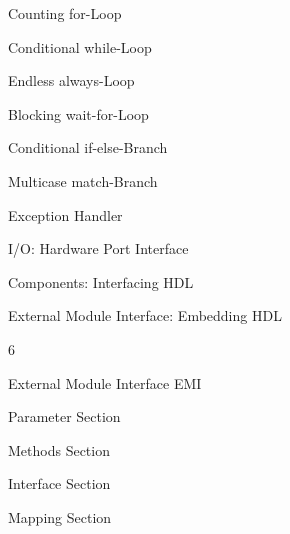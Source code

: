 \def\tocLXXXIII{Counting for-Loop}
{\bf{\parbox{0.95\textwidth}{\hskip20pt\tocLXXXIII\dotfill\pageref{toclabelLXXXIII}}}}\vskip5pt

\def\tocLXXXIV{Conditional while-Loop}
{\bf{\parbox{0.95\textwidth}{\hskip20pt\tocLXXXIV\dotfill\pageref{toclabelLXXXIV}}}}\vskip5pt

\def\tocLXXXV{Endless always-Loop}
{\bf{\parbox{0.95\textwidth}{\hskip20pt\tocLXXXV\dotfill\pageref{toclabelLXXXV}}}}\vskip5pt

\def\tocLXXXVI{Blocking wait-for-Loop}
{\bf{\parbox{0.95\textwidth}{\hskip20pt\tocLXXXVI\dotfill\pageref{toclabelLXXXVI}}}}\vskip5pt

\def\tocLXXXVII{Conditional if-else-Branch}
{\bf{\parbox{0.95\textwidth}{\hskip20pt\tocLXXXVII\dotfill\pageref{toclabelLXXXVII}}}}\vskip5pt

\def\tocLXXXVIII{Multicase match-Branch}
{\bf{\parbox{0.95\textwidth}{\hskip20pt\tocLXXXVIII\dotfill\pageref{toclabelLXXXVIII}}}}\vskip5pt

\def\tocLXXXIX{Exception Handler}
{\bf{\parbox{0.95\textwidth}{\hskip20pt\tocLXXXIX\dotfill\pageref{toclabelLXXXIX}}}}\vskip5pt

\def\tocXC{I/O: Hardware Port Interface}
{\bf{\parbox{0.95\textwidth}{\hskip10pt\tocXC\dotfill\pageref{toclabelXC}}}}\vskip5pt

\def\tocXCI{Components: Interfacing HDL}
{\bf{\parbox{0.95\textwidth}{\hskip20pt\tocXCI\dotfill\pageref{toclabelXCI}}}}\vskip5pt

\def\tocXCII{External Module Interface: Embedding HDL}
{\bf{\parbox{0.95\textwidth}{\hskip20pt\tocXCII\dotfill\pageref{toclabelXCII}}}}\vskip5pt

\def\tocXCIII{External Module Interface EMI}
{\vskip5pt\bf\large\hskip-30pt\parbox{30pt}{ 6}\parbox{0.95\textwidth}{\tocXCIII\dotfill\pageref{toclabelXCIII}}}\vskip10pt

\def\tocXCIV{Parameter Section}
{\bf{\parbox{0.95\textwidth}{\hskip10pt\tocXCIV\dotfill\pageref{toclabelXCIV}}}}\vskip5pt

\def\tocXCV{Methods Section}
{\bf{\parbox{0.95\textwidth}{\hskip10pt\tocXCV\dotfill\pageref{toclabelXCV}}}}\vskip5pt

\def\tocXCVI{Interface Section}
{\bf{\parbox{0.95\textwidth}{\hskip10pt\tocXCVI\dotfill\pageref{toclabelXCVI}}}}\vskip5pt

\def\tocXCVII{Mapping Section}
{\bf{\parbox{0.95\textwidth}{\hskip10pt\tocXCVII\dotfill\pageref{toclabelXCVII}}}}\vskip5pt

